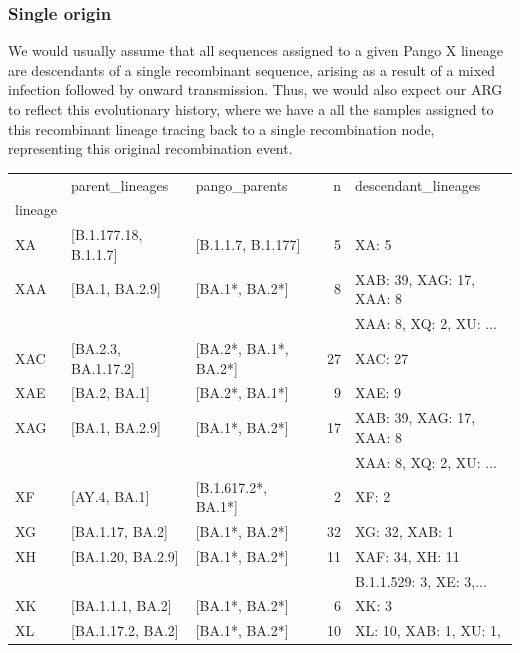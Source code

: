 \documentclass{article}
\begin{document}
\subsubsection{Single origin}
We would usually assume that all sequences assigned to a given Pango X lineage are descendants of a single recombinant sequence, arising as a result of a mixed infection followed by onward transmission. Thus, we would also expect our ARG to reflect this evolutionary history, where we have a all the samples assigned to this recombinant lineage tracing back to a single recombination node, representing this original recombination event.

\begin{table}
\begin{tabular}{lllrl}
\toprule
{} &              parent\_lineages &          pango\_parents &   n &
descendant\_lineages \\
lineage &                              &                        &     &
\\
\midrule
XA      &        [B.1.177.18, B.1.1.7] &     [B.1.1.7, B.1.177] &   5 & XA: 5 \\
XAA     &               [BA.1, BA.2.9] &         [BA.1*, BA.2*] &   8 &
    XAB: 39, XAG: 17, XAA: 8 \\
    &&&&   XAA: 8, XQ: 2, XU: ... \\
XAC     &          [BA.2.3, BA.1.17.2] &  [BA.2*, BA.1*, BA.2*] &  27 & XAC: 27 \\
XAE     &                 [BA.2, BA.1] &         [BA.2*, BA.1*] &   9 & XAE: 9 \\
XAG     &               [BA.1, BA.2.9] &         [BA.1*, BA.2*] &  17 &
    XAB: 39, XAG: 17, XAA: 8 \\
    &&&&   XAA: 8, XQ: 2, XU: ... \\
XF      &                 [AY.4, BA.1] &    [B.1.617.2*, BA.1*] &   2 & XF: 2 \\
XG      &              [BA.1.17, BA.2] &         [BA.1*, BA.2*] &  32 & XG: 32, XAB: 1 \\
XH      &            [BA.1.20, BA.2.9] &         [BA.1*, BA.2*] &  11 &
    XAF: 34, XH: 11 \\
&&&& B.1.1.529: 3, XE: 3,... \\
XK      &             [BA.1.1.1, BA.2] &         [BA.1*, BA.2*] &   6 & XK: 3 \\
XL      &            [BA.1.17.2, BA.2] &         [BA.1*, BA.2*] &  10 &
    XL: 10, XAB: 1, XU: 1, \\

\end{tabular}
\end{table}
\end{document}
